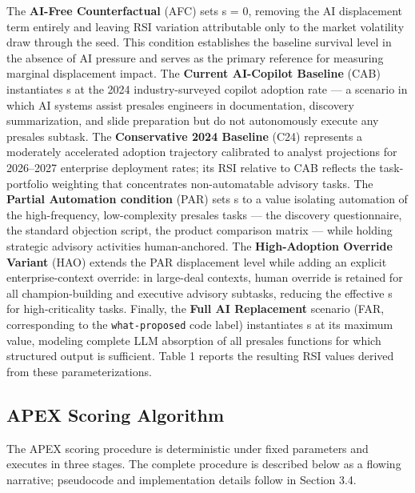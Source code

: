 \documentclass[10pt, conference]{IEEEtran}
\begin{document}
{The \textbf{AI-Free Counterfactual} (AFC) sets s = 0, removing the AI displacement term entirely and leaving RSI variation attributable only to the market volatility draw through the seed. This condition establishes the baseline survival level in the absence of AI pressure and serves as the primary reference for measuring marginal displacement impact. The \textbf{Current AI-Copilot Baseline} (CAB) instantiates s at the 2024 industry-surveyed copilot adoption rate --- a scenario in which AI systems assist presales engineers in documentation, discovery summarization, and slide preparation but do not autonomously execute any presales subtask. The \textbf{Conservative 2024 Baseline} (C24) represents a moderately accelerated adoption trajectory calibrated to analyst projections for 2026--2027 enterprise deployment rates; its RSI relative to CAB reflects the task-portfolio weighting that concentrates non-automatable advisory tasks. The \textbf{Partial Automation condition} (PAR) sets s to a value isolating automation of the high-frequency, low-complexity presales tasks --- the discovery questionnaire, the standard objection script, the product comparison matrix --- while holding strategic advisory activities human-anchored. The \textbf{High-Adoption Override Variant} (HAO) extends the PAR displacement level while adding an explicit enterprise-context override: in large-deal contexts, human override is retained for all champion-building and executive advisory subtasks, reducing the effective s for high-criticality tasks. Finally, the \textbf{Full AI Replacement} scenario (FAR, corresponding to the \texttt{what-proposed} code label) instantiates s at its maximum value, modeling complete LLM absorption of all presales functions for which structured output is sufficient. Table 1 reports the resulting RSI values derived from these parameterizations.

\subsection{APEX Scoring Algorithm}

\label{sec:apex_scoring_algorithm}

The APEX scoring procedure is deterministic under fixed parameters and executes in three stages. The complete procedure is described below as a flowing narrative; pseudocode and implementation details follow in Section 3.4.

}
\end{document}
